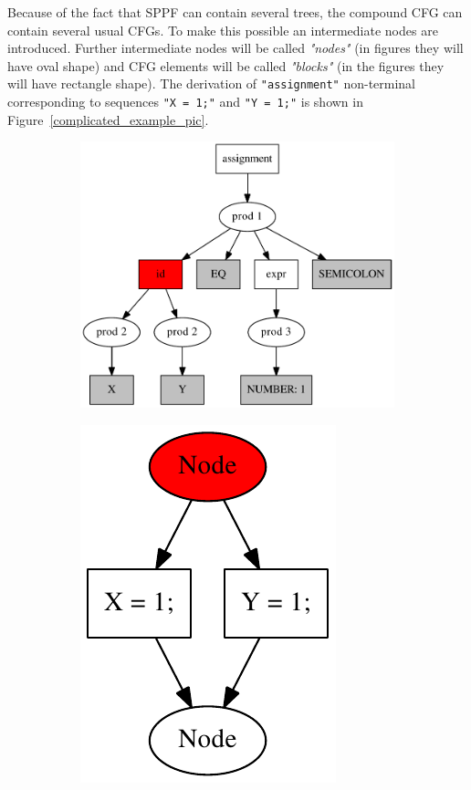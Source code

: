 \documentclass{sig-alternate-05-2015}
\begin{document}
Because of the fact that SPPF can contain several trees, the compound CFG can contain several usual CFGs. To make this possible an intermediate nodes are introduced. Further intermediate nodes will be called \textit{"nodes"} (in figures they will have oval shape) and CFG elements will be called \textit{"blocks"} (in the figures they will have rectangle shape). The derivation of \verb|"assignment"| non-terminal corresponding to sequences \verb|"X = 1;"| and \verb|"Y = 1;"| is shown in Figure~\ref{complicated_example_pic}. 

\begin{figure}[h!]
    \begin{center}
    \begin{subfigure}{0.3\textwidth}    
        \includegraphics[scale=0.3]{Graphs/cfg_idea_complicated.pdf}    
    \caption{}
    \label{complicated_a}
    \end{subfigure}
    \begin{subfigure}{0.1\textwidth}      
            \includegraphics[scale=0.5]{Graphs/assignment_complicated.pdf}

\end{subfigure}
\end{center}
\end{figure}
\end{document}

